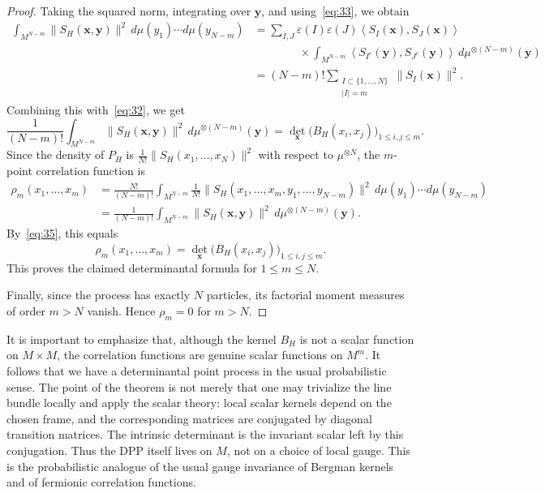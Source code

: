 \documentclass[12pt,a4paper,reqno]{article}
\theoremstyle{thmstyleone}
\theoremstyle{thmstylethree}
\theoremstyle{thmstyletwo}
\numberwithin{equation}{subsection}
\def\leq{\leqslant}
\begin{document}
\begin{proof}
Taking the squared norm, integrating over $\mathbf y$, and using~\eqref{eq:33}, we obtain
\[
\begin{aligned}
\int_{M^{N-m}}
\|S_H(\mathbf x,\mathbf y)\|^2
\,d\mu(y_1)\cdots d\mu(y_{N-m})
&=
\sum_{I,J}
\varepsilon(I)\varepsilon(J)
\left\langle S_I(\mathbf x),S_J(\mathbf x)\right\rangle
\\
&\qquad\qquad\times
\int_{M^{N-m}}
\left\langle
S_{I^c}(\mathbf y),S_{J^c}(\mathbf y)
\right\rangle
\,d\mu^{\otimes(N-m)}(\mathbf y)
\\
&=
(N-m)!
\sum_{\substack{I\subset\{1,\ldots,N\}\\ |I|=m}}
\|S_I(\mathbf x)\|^2.
\end{aligned}
\]
Combining this with~\eqref{eq:32}, we get
\begin{equation}\label{eq:35}
\frac{1}{(N-m)!}
\int_{M^{N-m}}
\|S_H(\mathbf x,\mathbf y)\|^2
\,d\mu^{\otimes(N-m)}(\mathbf y)
=
\det_{\mathbf x}\bigl(B_H(x_i,x_j)\bigr)_{1\leq i,j\leq m}.
\end{equation}
Since the density of $P_H$ is $\frac{1}{N!}\|S_H(x_1,\ldots,x_N)\|^2$ with respect to $\mu^{\otimes N}$, the $m$-point correlation function is
\[
\begin{aligned}
\rho_m(x_1,\ldots,x_m)
&=
\frac{N!}{(N-m)!}
\int_{M^{N-m}}
\frac{1}{N!}
\|S_H(x_1,\ldots,x_m,y_1,\ldots,y_{N-m})\|^2
\,d\mu(y_1)\cdots d\mu(y_{N-m})
\\
&=
\frac{1}{(N-m)!}
\int_{M^{N-m}}
\|S_H(\mathbf x,\mathbf y)\|^2
\,d\mu^{\otimes(N-m)}(\mathbf y).
\end{aligned}
\]
By~\eqref{eq:35}, this equals
\[
\rho_m(x_1,\ldots,x_m)
=
\det_{\mathbf x}\bigl(B_H(x_i,x_j)\bigr)_{1\leq i,j\leq m}.
\]
This proves the claimed determinantal formula for $1\leq m\leq N$.

Finally, since the process has exactly $N$ particles, its factorial moment measures of order $m>N$ vanish. Hence $\rho_m=0$ for $m>N$.
\end{proof}

It is important to emphasize that, although the kernel $B_H$ is not a scalar function on $M\times M$, the correlation functions are genuine scalar functions on $M^m$. It follows that we have a determinantal point process in the usual probabilistic sense. The point of the theorem is not merely that one may trivialize the line bundle locally and apply the scalar theory: local scalar kernels depend on the chosen frame, and the corresponding matrices are conjugated by diagonal transition matrices. The intrinsic determinant is the invariant scalar left by this conjugation. Thus the DPP itself lives on $M$, not on a choice of local gauge. This is the probabilistic analogue of the usual gauge invariance of Bergman kernels and of fermionic correlation functions.
\end{document}
